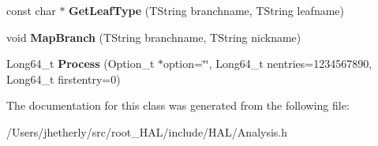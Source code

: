 \begin{DoxyCompactItemize}
\item 
\hypertarget{class_h_a_l_1_1_analysis_a8410426a53f7828270531f1ec56340b8}{const char $\ast$ {\bfseries Get\+Leaf\+Type} (T\+String branchname, T\+String leafname)}\label{class_h_a_l_1_1_analysis_a8410426a53f7828270531f1ec56340b8}

\item 
\hypertarget{class_h_a_l_1_1_analysis_a6e11fa65e712377587ed4b6a1a62c8aa}{void {\bfseries Map\+Branch} (T\+String branchname, T\+String nickname)}\label{class_h_a_l_1_1_analysis_a6e11fa65e712377587ed4b6a1a62c8aa}

\item 
\hypertarget{class_h_a_l_1_1_analysis_a4278a2e961076913371dec71da389701}{Long64\+\_\+t {\bfseries Process} (Option\+\_\+t $\ast$option=\char`\"{}\char`\"{}, Long64\+\_\+t nentries=1234567890, Long64\+\_\+t firstentry=0)}\label{class_h_a_l_1_1_analysis_a4278a2e961076913371dec71da389701}

\end{DoxyCompactItemize}


The documentation for this class was generated from the following file\+:\begin{DoxyCompactItemize}
\item 
/\+Users/jhetherly/src/root\+\_\+\+H\+A\+L/include/\+H\+A\+L/Analysis.\+h\end{DoxyCompactItemize}
